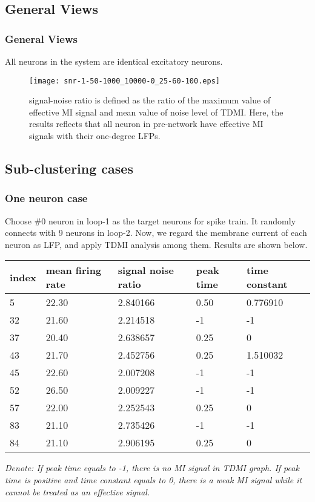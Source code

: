 \documentclass{beamer}
\begin{document}
	\subsection{General Views}
	\begin{frame}
	\frametitle{General Views}
		\scriptsize{All neurons in the system are identical excitatory neurons.} 
		\begin{figure}
			\centering
			\texttt{[image: snr-1-50-1000\_10000-0\_25-60-100.eps]}
			\caption{\scriptsize{signal-noise ratio is defined as the ratio of the maximum value of effective MI signal and mean value of noise level of TDMI. Here, the results reflects that all neuron in pre-network have effective MI signals with their one-degree LFPs.}}
			\label{fig:snr_all_1}
		\end{figure}
	\end{frame}

	\subsection{Sub-clustering cases}
	\begin{frame}
	\frametitle{One neuron case}
		Choose \#0 neuron in loop-1 as the target neurons for spike train. It randomly connects with 9 neurons in loop-2. Now, we regard the membrane current of each neuron as LFP, and apply TDMI analysis among them. Results are shown below.
		\begin{table}[h]
		\scriptsize
		\begin{tabular}{l l l l l}
			\hline
			index & mean firing rate & signal noise ratio & peak time & time constant \\
			\hline
			5  & 22.30 & 2.840166 & 0.50 & 0.776910 \\
			32 & 21.60 & 2.214518 & -1   & -1 \\
			37 & 20.40 & 2.638657 & 0.25 & 0 \\
			43 & 21.70 & 2.452756 & 0.25 & 1.510032 \\
			45 & 22.60 & 2.007208 & -1	 & -1 \\
			52 & 26.50 & 2.009227 & -1   & -1 \\
			57 & 22.00 & 2.252543 & 0.25 & 0 \\
			83 & 21.10 & 2.735426 & -1   & -1 \\
			84 & 21.10 & 2.906195 & 0.25 & 0 \\
			\hline
		\end{tabular}
		\end{table}
		\footnotesize{\emph{Denote: If peak time equals to -1, there is no MI signal in TDMI graph. If peak time is positive and time constant equals to 0, there is a weak MI signal while it cannot be treated as an effective signal.}}
	\end{frame}
\end{document}
